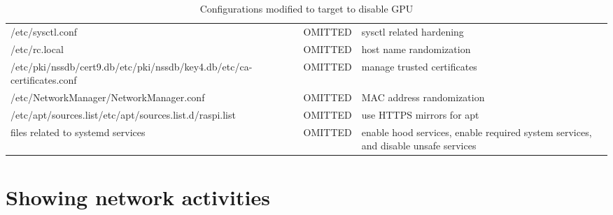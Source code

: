 \documentclass[mscthesis]{usiinfthesis}
\begin{document}
\begin{landscape}
\begin{table}[H]
\begin{tabular}{|p{70mm}|p{40mm}|p{80mm}|}
      /etc/sysctl.conf                                                                         & OMITTED                                                                                                             & sysctl related hardening                                                           \\
      /etc/rc.local                                                                            & OMITTED                                                                                                             & host name randomization                                                            \\
      /etc/pki/nssdb/cert9.db\newline /etc/pki/nssdb/key4.db\newline /etc/ca-certificates.conf & OMITTED                                                                                                             & manage trusted certificates                                                        \\
      /etc/NetworkManager/NetworkManager.conf                                                  & OMITTED                                                                                                             & MAC address randomization                                                          \\
      /etc/apt/sources.list\newline /etc/apt/sources.list.d/raspi.list                         & OMITTED                                                                                                             & use HTTPS mirrors for apt                                                          \\
      files related to systemd services                                                        & OMITTED                                                                                                             & enable hood services, enable required system services, and disable unsafe services \\
      \hline
    \end{tabular}
    \caption{Configurations modified to target to disable GPU}
    \label{tab:other_config}
  \end{table}
\end{landscape}


\chapter{Showing network activities}
\end{document}
